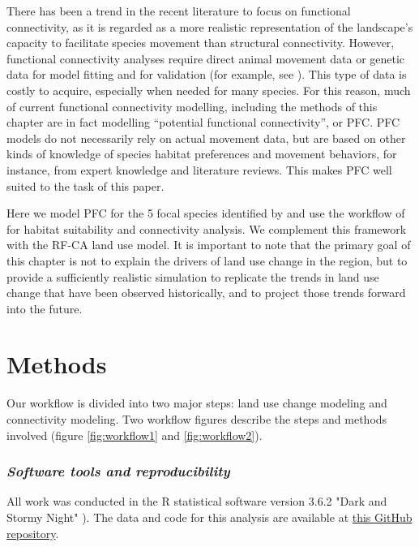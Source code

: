 There has been a trend in the recent literature to focus on functional connectivity, as it is regarded as a more realistic representation of  the landscape’s capacity to facilitate species movement than structural connectivity. However, functional connectivity analyses require direct animal movement data or genetic data for model fitting and for validation (for example, see \cite{beyer_functional_2013, milanesi_three-dimensional_2017}). This type of data is costly to acquire, especially when needed for many species. For this reason, much of current functional connectivity modelling, including the methods of this chapter are in fact modelling “potential functional connectivity”, or PFC. PFC models do not necessarily rely on actual movement data, but are based on other kinds of knowledge of species habitat preferences and movement behaviors, for instance, from expert knowledge and literature reviews. This makes PFC well suited to the task of this paper.

Here we model  PFC for the 5 focal species identified by  \cite{meurant_selecting_2018} and use the workflow of \citep{rayfield_priorisation_2018} for habitat suitability and connectivity analysis. We complement this framework with the RF-CA land use model. It is important to note that the primary goal of this chapter is not to explain the drivers of land use change in the region, but to provide a sufficiently realistic simulation to replicate the trends in land use change that have been observed historically, and to project those trends forward into the future.  \\

\section{Methods}

Our workflow is divided into two major steps: land use change modeling and connectivity modeling. Two workflow figures describe the steps and methods involved (figure \ref{fig:workflow1} and \ref{fig:workflow2}). \\

\subsubsection*{\textit{Software tools and reproducibility}}

All work was conducted in the R statistical software version 3.6.2 "Dark and Stormy Night" \citep[see][]{R}). The data and code for this analysis are available at \href{https://github.com/VLucet/landchange-connectivity-Montérégie}{this GitHub repository}.

